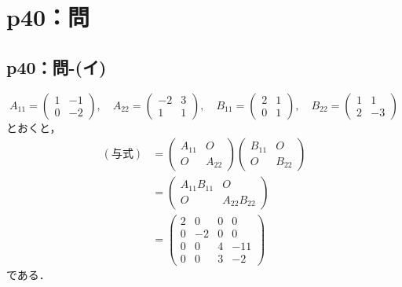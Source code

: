 \documentclass[a4paper,10pt,fleqn]{ltjsarticle}
\begin{document}
\section*{p40：問}

\subsection*{p40：問-(イ)}

\begin{tleftbar}
    \[
        A_{11} = \begin{pmatrix} 1 & -1 \\ 0 & -2 \end{pmatrix},\quad A_{22} = \begin{pmatrix} -2 & 3 \\ 1 & 1 \end{pmatrix} ,\quad B_{11} = \begin{pmatrix} 2 & 1 \\ 0 & 1\end{pmatrix} ,\quad B_{22}= \begin{pmatrix} 1 & 1 \\ 2 & -3 \end{pmatrix}
    \]
    とおくと，
    \begin{align*}
        (\text{与式}) & = \begin{pmatrix} A_{11} & O \\ O & A_{22} \end{pmatrix} \begin{pmatrix} B_{11} & O \\ O & B_{22} \end{pmatrix} \\
                    & = \begin{pmatrix} A_{11} B_{11} & O \\ O & A_{22} B_{22} \end{pmatrix}                                          \\
                    & = \begin{pmatrix} 2 & 0 & 0 & 0 \\ 0 & -2 & 0 & 0 \\ 0 & 0 & 4 & -11 \\ 0 & 0 & 3 & -2 \end{pmatrix}
    \end{align*}
    である．
\end{tleftbar}
\end{document}
